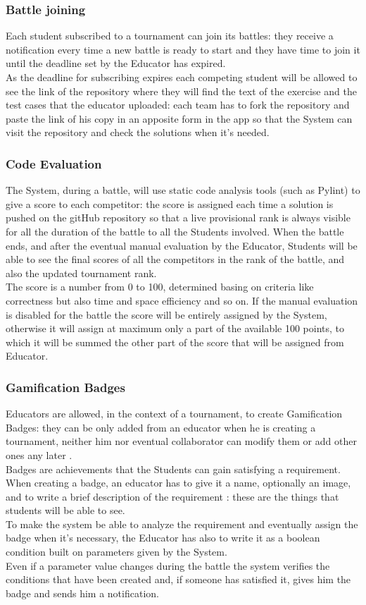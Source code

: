 \documentclass{article}
\begin{document}
\subsubsection{Battle joining}
Each student subscribed to a tournament can join its battles: they receive a notification every time a new battle is ready to start and they have time to join it until the deadline set by the Educator has expired.\\
As the deadline for subscribing expires each competing student will be allowed to see the link of the repository where they will find the text of the exercise and the test cases that the educator uploaded: each team has to fork the repository and paste the link of his copy in an apposite form in the app so that the System can visit the repository and check the solutions when it's needed.
\newpage
\subsubsection{Code Evaluation}
The System, during a battle, will use static code analysis tools (such as Pylint) to give a score to each competitor: the score is assigned each time a solution is pushed on the gitHub repository so that a live provisional rank is always visible for all the duration of the battle to all the Students involved. 
When the battle ends, and after the eventual manual evaluation by the Educator, Students will be able to see the final scores of all the competitors in the rank of the battle, and also the updated tournament rank.\\
The score is a number from 0 to 100, determined basing on criteria like correctness but also time and space efficiency and so on.
If the manual evaluation is disabled for the battle the score will be entirely assigned by the System, otherwise it will assign at maximum only a part of the available 100 points, to which it will be summed the other part of the score that will be assigned from Educator.
\subsubsection{Gamification Badges}
Educators are allowed, in the context of a tournament, to create Gamification Badges: they can be only added from an educator when he is creating a tournament, neither him nor eventual collaborator can modify them or add other ones any later .\\
Badges are achievements that the Students can gain satisfying a requirement.\\
When creating a badge, an educator has to give it a name, optionally an image, and to write a brief description of the requirement : these are the things that students will be able to see.\\
To make the system be able to analyze the requirement and eventually assign the badge when it's necessary, the Educator has also to write it as a boolean condition built on parameters given by the System.\\
Even if a parameter value changes during the battle the system verifies the conditions that have been created and, if someone has satisfied it, gives him the badge and sends him a notification.\\
\end{document}
